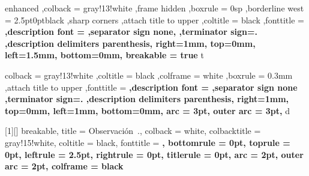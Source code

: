 \theoremstyle{definition}

\newtheorem{lemma}{Lema}[section]
\newtheorem{example}{Ejemplo}[section]
\newtheorem{theorem}{Teorema}[section]
\newtheorem{problem}{Problema}[section]
\newtheorem{property}{Propiedad}[section]
\newtheorem{exercise}{Ejercicio}[section]
\newtheorem{corollary}{Corolario}[section]
\newtheorem{definition}{Definición}[section]

\newtheorem*{note}{Nota}
\newtheorem*{hint}{Pista}

\newenvironment{solution}[1][]
{
    \begin{proof}[\textnormal{\textbf{Solución\ifthenelse{\equal{#1}{}}{}{ #1}}}]
    }{
    \end{proof}
}


{
    enhanced
    ,colback = gray!13!white
    ,frame hidden
    ,boxrule = 0sp
    ,borderline west = {2.5pt}{0pt}{black}
    ,sharp corners
    ,attach title to upper
    ,coltitle = black
    ,fonttitle = \bfseries
    ,description font = \mdseries
    ,separator sign none,
    ,terminator sign={.\hspace{2mm}}
    ,description delimiters parenthesis,
    right=1mm,
    top=0mm,
    left=1.5mm,
    bottom=0mm,
    breakable = true
}
{t}

{
    colback = gray!13!white
    ,coltitle = black
    ,colframe = white
    ,boxrule = 0.3mm
    ,attach title to upper
    ,fonttitle = \bfseries
    ,description font = \mdseries
    ,separator sign none
    ,terminator sign={.\hspace{2mm}}
    ,description delimiters parenthesis,
    right=1mm,
    top=0mm,
    left=1mm,
    bottom=0mm,
    arc = 3pt,
    outer arc = 3pt,
}
{d}




[1][]
{
    breakable,
    title = Observación~\thetcbcounter.,
    colback = white,
    colbacktitle = gray!15!white,
    coltitle = black,
    fonttitle = \bfseries,
    bottomrule = 0pt,
    toprule = 0pt,
    leftrule = 2.5pt,
    rightrule = 0pt,
    titlerule = 0pt,
    arc = 2pt,
    outer arc = 2pt,
    colframe = black
}